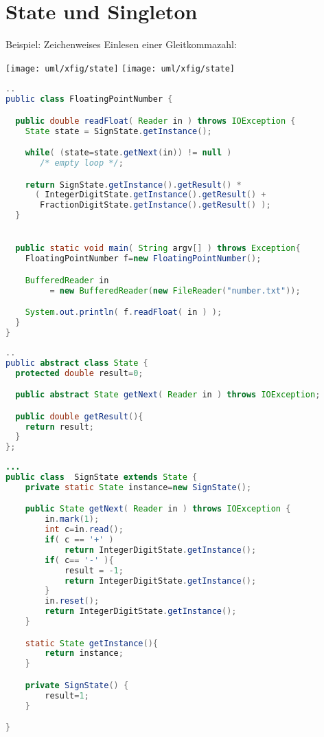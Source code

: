 \section{State und Singleton}
Beispiel: Zeichenweises Einlesen einer Gleitkommazahl:
\begin{center}
\ifslides
\texttt{[image: uml/xfig/state]}
\else
\texttt{[image: uml/xfig/state]}
\fi
\end{center}
\ifslides
\newpage
\fi
\begin{lstlisting}[language=java]
..
public class FloatingPointNumber {

  public double readFloat( Reader in ) throws IOException {
    State state = SignState.getInstance();

    while( (state=state.getNext(in)) != null )
       /* empty loop */;

    return SignState.getInstance().getResult() *
      ( IntegerDigitState.getInstance().getResult() +
       FractionDigitState.getInstance().getResult() );
  }


  public static void main( String argv[] ) throws Exception{
    FloatingPointNumber f=new FloatingPointNumber();

    BufferedReader in
         = new BufferedReader(new FileReader("number.txt"));

    System.out.println( f.readFloat( in ) );
  }
}
\end{lstlisting}
\newslide
\begin{lstlisting}[language=java]
..
public abstract class State {
  protected double result=0;

  public abstract State getNext( Reader in ) throws IOException;

  public double getResult(){
    return result;
  }
};
\end{lstlisting}
\newslide
\begin{lstlisting}[language=java]
...
public class  SignState extends State {
    private static State instance=new SignState();

    public State getNext( Reader in ) throws IOException {
        in.mark(1);
        int c=in.read();
        if( c == '+' )
            return IntegerDigitState.getInstance();
        if( c== '-' ){
            result = -1;
            return IntegerDigitState.getInstance();
        }
        in.reset();
        return IntegerDigitState.getInstance();
    }

    static State getInstance(){
        return instance;
    }

    private SignState() {
        result=1;
    }

}
\end{lstlisting}
